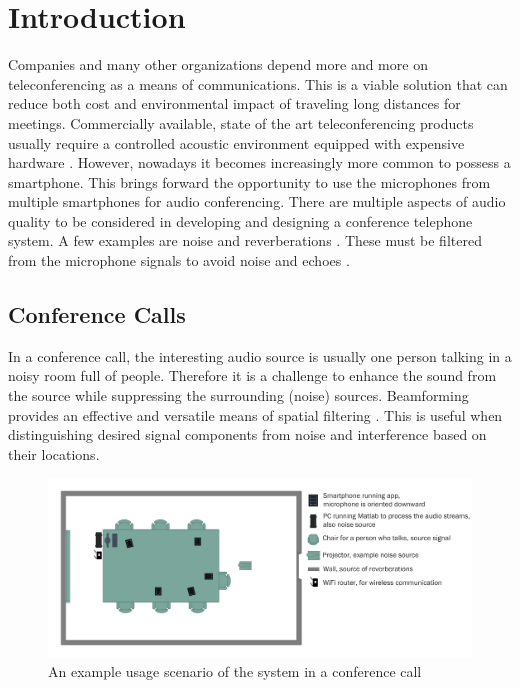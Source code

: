 \chapter{Introduction}
\label{chap:introduction}

Companies and many other organizations depend more and more on teleconferencing as a means of communications. This is a viable solution that can reduce both cost and environmental impact of traveling long distances for meetings.
Commercially available, state of the art teleconferencing products usually require a controlled acoustic environment equipped with expensive hardware \cite{pentek2015}. However, nowadays it becomes increasingly more common to possess a smartphone. This brings forward the opportunity to use the microphones from multiple smartphones for audio conferencing. There are multiple aspects of audio quality to be considered in developing and designing a conference telephone system. A few examples are noise and reverberations \cite{vanveen1988}. These must be filtered from the microphone signals to avoid noise and echoes \cite{naylor2010speech}.

\section{Conference Calls}
\label{sec:intro_conference}
In a conference call, the interesting audio source is usually one person talking in a noisy room full of people. Therefore it is a challenge to enhance the sound from the source while suppressing the surrounding (noise) sources. Beamforming provides an effective and versatile means of spatial filtering \cite{vanveen1988}. This is useful when distinguishing desired signal components from noise and interference based on their locations.

\begin{figure}[b!]
    \centering
    \includegraphics[width=15cm]{images/usage_scenario.pdf}
    \caption{An example usage scenario of the system in a conference call}
    \label{fig:SchemUsage}
\end{figure}

